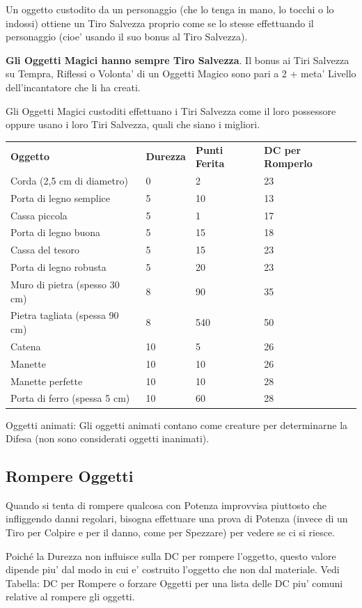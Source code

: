 \documentclass[a4paper,11pt,twoside,openany]{book}
\begin{document}
{		Un oggetto custodito da un personaggio (che lo tenga in mano, lo tocchi o lo indossi) ottiene un Tiro Salvezza proprio come se lo stesse effettuando il personaggio (cioe' usando il suo bonus al Tiro Salvezza).
		
		\textbf{Gli Oggetti Magici hanno sempre Tiro Salvezza}. Il bonus ai Tiri Salvezza su Tempra, Riflessi o Volonta' di un Oggetti Magico sono pari a 2 + meta' Livello dell'incantatore che li ha creati.
		
		Gli Oggetti Magici custoditi effettuano i Tiri Salvezza come il loro possessore oppure usano i loro Tiri Salvezza, quali che siano i migliori.
		
		\bigskip
		
		\begin{tabular}{L{6cm} L{3cm} L{3cm} L{3cm}}
			\toprule
			\textbf{Oggetto} & \textbf{Durezza} & \textbf{Punti Ferita} & \textbf{DC per Romperlo}\tabularnewline
			Corda (2,5 cm di diametro) & 0 & 2 & 23\tabularnewline
			Porta di legno semplice & 5 & 10 & 13\tabularnewline
			Cassa piccola & 5 & 1 & 17\tabularnewline
			Porta di legno buona & 5 & 15 & 18\tabularnewline
			Cassa del tesoro & 5 & 15 & 23\tabularnewline
			Porta di legno robusta & 5 & 20 & 23\tabularnewline
			Muro di pietra (spesso 30 cm) & 8 & 90 & 35\tabularnewline
			Pietra tagliata (spessa 90 cm) & 8 & 540 & 50\tabularnewline
			Catena & 10 & 5 & 26\tabularnewline
			Manette & 10 & 10 & 26\tabularnewline
			Manette perfette & 10 & 10 & 28\tabularnewline
			Porta di ferro (spessa 5 cm) & 10 & 60 & 28\tabularnewline
		\end{tabular}
		
		\bigskip
		
		Oggetti animati: Gli oggetti animati contano come creature per determinarne
		la Difesa (non sono considerati oggetti inanimati).
		
		\subsection{Rompere Oggetti}
		
		\label{rompere-oggetti}
		
		Quando si tenta di rompere qualcosa con Potenza improvvisa piuttosto che infliggendo danni regolari, bisogna effettuare una prova di Potenza (invece di un Tiro per Colpire e per il danno, come per Spezzare) per vedere se ci si riesce. 
		
		Poiché la Durezza non influisce sulla DC per rompere l'oggetto, questo valore dipende piu' dal modo in cui e' costruito l'oggetto che non dal materiale. Vedi Tabella: DC per Rompere o forzare Oggetti per una lista delle DC piu' comuni relative al rompere gli oggetti.
		
}
\end{document}

